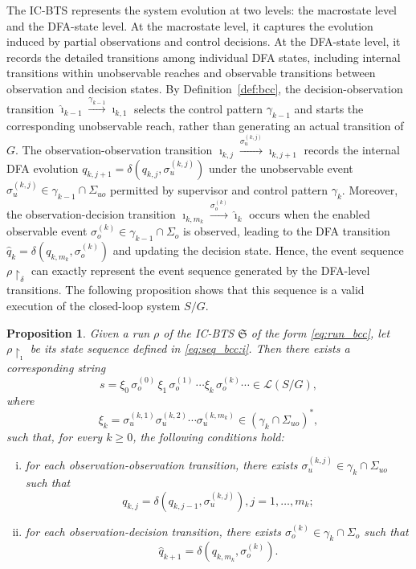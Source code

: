 \documentclass[twocolumn]{autart}
\newtheorem{mypro}{\bf Proposition}
\begin{document}
The IC-BTS represents the system evolution at two levels: the macrostate level and the DFA-state level. 
At the macrostate level, it captures the evolution induced by partial observations and control decisions. 
At the DFA-state level, it records the detailed transitions among individual DFA states, including internal transitions within unobservable reaches and observable transitions between observation and decision states.
%
By Definition~\ref{def:bcc}, the decision-observation transition
$\hat{\imath}_{k-1} \xrightarrow{\gamma_{k-1}} \imath_{k,1}$
selects the control pattern $\gamma_{k-1}$ and starts the corresponding unobservable reach, rather than generating an actual transition of $G$.
The observation-observation transition
$\imath_{k,j} \xrightarrow{\sigma_u^{(k,j)}} \imath_{k,j+1}$
records the internal DFA evolution
$q_{k,j+1} = \delta(q_{k,j},\sigma_u^{(k,j)})$
under the unobservable event
$\sigma_u^{(k,j)} \in \gamma_{k-1}\cap\Sigma_{uo}$ permitted by supervisor and control pattern $\gamma_k$.
Moreover, the observation-decision transition
$\imath_{k,m_k} \xrightarrow{\sigma_o^{(k)}} \hat{\imath}_{k}$
occurs when the enabled observable event
$\sigma_o^{(k)}\in\gamma_{k-1}\cap\Sigma_o$
is observed, leading to the DFA transition
$\hat{q}_{k} = \delta(q_{k,m_k},\sigma_o^{(k)})$
and updating the decision state.
%
Hence, the event sequence $\rho\restriction_{\delta}$ can exactly represent the event sequence generated by the DFA-level transitions.
The following proposition shows that this sequence is a valid execution of the closed-loop system $S / G$.
%
\begin{mypro}
\label{prop:bcc_dfa_consistency}
Given a run $\rho$ of the IC-BTS $\mathfrak{S}$ of the form \eqref{eq:run_bcc}, let
$\rho\restriction_{\imath}$ be its state sequence defined in \eqref{eq:seq_bcc:i}.
Then there exists a corresponding string
$$
s = \xi_0\,\sigma_o^{(0)}\,\xi_1\,\sigma_o^{(1)}\,\cdots\xi_k\,\sigma_o^{(k)}\cdots\in \mathcal{L}(S/G),
$$
where
$$
\xi_k = \sigma_u^{(k,1)}\sigma_u^{(k,2)}\cdots\sigma_u^{(k,m_k)}\in(\gamma_k\cap\Sigma_{uo})^*,
$$
such that, for every $k\geq 0$, the following conditions hold:
\begin{enumerate}[(i)]
    \item for each observation-observation transition, there exists
    $\sigma_u^{(k,j)} \in \gamma_k\cap\Sigma_{uo}$ such that
    $$
        q_{k,j} = \delta(q_{k,j-1},\sigma_u^{(k,j)}), j = 1, \ldots, m_k;
    $$

    \item for each observation-decision transition, there exists
    $\sigma_o^{(k)} \in \gamma_k\cap\Sigma_o$ such that
    $$
        \hat q_{k+1} = \delta(q_{k,m_k},\sigma_o^{(k)}).
    $$
\end{enumerate}
\end{mypro}
\end{document}
